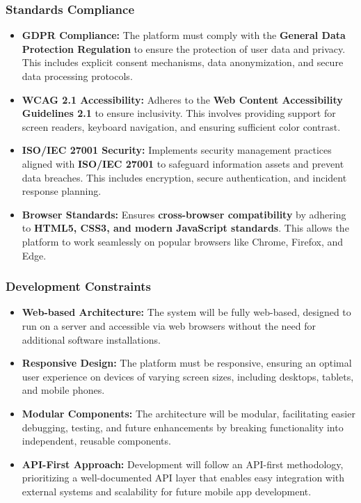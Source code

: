 \subsubsection*{Standards Compliance}
\begin{itemize}
    \item \textbf{GDPR Compliance:} 
    The platform must comply with the \textbf{General Data Protection Regulation} to ensure the protection of user data and privacy. This includes explicit consent mechanisms, data anonymization, and secure data processing protocols.
    \item \textbf{WCAG 2.1 Accessibility:} 
    Adheres to the \textbf{Web Content Accessibility Guidelines 2.1} to ensure inclusivity. This involves providing support for screen readers, keyboard navigation, and ensuring sufficient color contrast.
    \item \textbf{ISO/IEC 27001 Security:} 
    Implements security management practices aligned with \textbf{ISO/IEC 27001} to safeguard information assets and prevent data breaches. This includes encryption, secure authentication, and incident response planning.
    \item \textbf{Browser Standards:} 
    Ensures \textbf{cross-browser compatibility} by adhering to \textbf{HTML5, CSS3, and modern JavaScript standards}. This allows the platform to work seamlessly on popular browsers like Chrome, Firefox, and Edge.
\end{itemize}

\subsubsection*{Development Constraints}
\begin{itemize}
    \item \textbf{Web-based Architecture:} 
    The system will be fully web-based, designed to run on a server and accessible via web browsers without the need for additional software installations.
    \item \textbf{Responsive Design:} 
    The platform must be responsive, ensuring an optimal user experience on devices of varying screen sizes, including desktops, tablets, and mobile phones.
    \item \textbf{Modular Components:} 
    The architecture will be modular, facilitating easier debugging, testing, and future enhancements by breaking functionality into independent, reusable components.
    \item \textbf{API-First Approach:} 
    Development will follow an API-first methodology, prioritizing a well-documented API layer that enables easy integration with external systems and scalability for future mobile app development.
\end{itemize}

